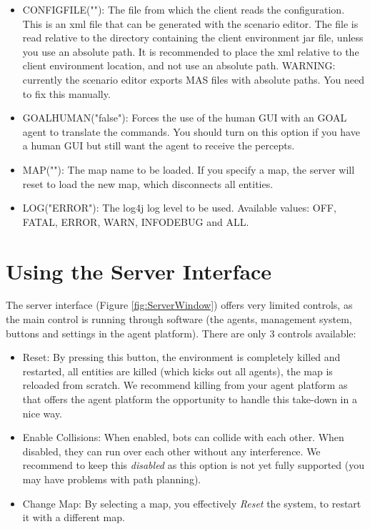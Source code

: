 \documentclass[11pt,a4paper]{article}
\begin{document}
\begin{itemize}
\item
    CONFIGFILE(""):
    The file from which the client reads the configuration. This is an xml file that can be generated with the scenario editor. The file is read relative to the directory containing the client environment jar file, unless you use an absolute path. It is recommended to place the xml relative to the client environment location, and not use an absolute path. WARNING: currently the scenario editor exports MAS files with absolute paths. You need to fix this manually.
 
\item
    GOALHUMAN("false"):
    Forces the use of the human GUI with an GOAL agent to translate the commands. You should turn on this option if you have a human GUI but still want the agent to receive the percepts.

\item
    MAP(""):
    The map name to be loaded. If you specify a map, the server will reset to load the new map, which disconnects all entities.
     
\item    
    LOG("ERROR"):
    The log4j log level to be used. Available values: OFF, FATAL, ERROR, WARN, INFODEBUG and ALL.

\end{itemize}


\section{Using the Server Interface}
The server interface (Figure \ref{fig:ServerWindow}) offers very limited controls, as the main control is running through software (the agents, management system, buttons and settings in the agent platform). There are only 3 controls available:
\begin{itemize}
\item{Reset}: By pressing this button, the environment is completely killed and restarted, all entities are killed (which kicks out all agents), the map is reloaded from scratch. We recommend killing from your agent platform as that offers the agent platform the opportunity to handle this take-down in a nice way.
\item{Enable Collisions}: When enabled, bots can collide with each other. When disabled, they can run over each other without any interference. We recommend to keep this \emph{disabled} as this option is not yet fully supported (you may have problems with path planning).
\item{Change Map}: By selecting a map, you effectively \emph{Reset} the system, to restart it with a different map.
\end{itemize}
\end{document}
